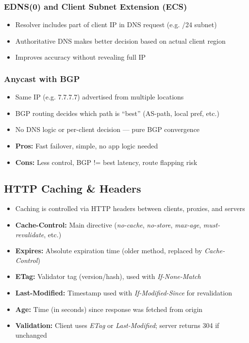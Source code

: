 \begin{multicols*}{5}
		\subsubsection{EDNS(0) and Client Subnet Extension (ECS)}
		\begin{itemize}
			\item Resolver includes part of client IP in DNS request (e.g. /24 subnet)
			\item Authoritative DNS makes better decision based on actual client region
			\item Improves accuracy without revealing full IP
		\end{itemize}
		
		\subsubsection{Anycast with BGP}
		\begin{itemize}
			\item Same IP (e.g. 7.7.7.7) advertised from multiple locations
			\item BGP routing decides which path is “best” (AS-path, local pref, etc.)
			\item No DNS logic or per-client decision — pure BGP convergence
			\item \textbf{Pros:} Fast failover, simple, no app logic needed
			\item \textbf{Cons:} Less control, BGP != best latency, route flapping risk
		\end{itemize}
		\subsection{HTTP Caching \& Headers}
		\begin{itemize}
			\item Caching is controlled via HTTP headers between clients, proxies, and servers
			\item \textbf{Cache-Control:} Main directive (\textit{no-cache}, \textit{no-store}, \textit{max-age}, \textit{must-revalidate}, etc.)
			\item \textbf{Expires:} Absolute expiration time (older method, replaced by \textit{Cache-Control})
			\item \textbf{ETag:} Validator tag (version/hash), used with \textit{If-None-Match}
			\item \textbf{Last-Modified:} Timestamp used with \textit{If-Modified-Since} for revalidation
			\item \textbf{Age:} Time (in seconds) since response was fetched from origin
			\item \textbf{Validation:} Client uses \textit{ETag} or \textit{Last-Modified}; server returns 304 if unchanged
		\end{itemize}
		

\end{multicols*}
